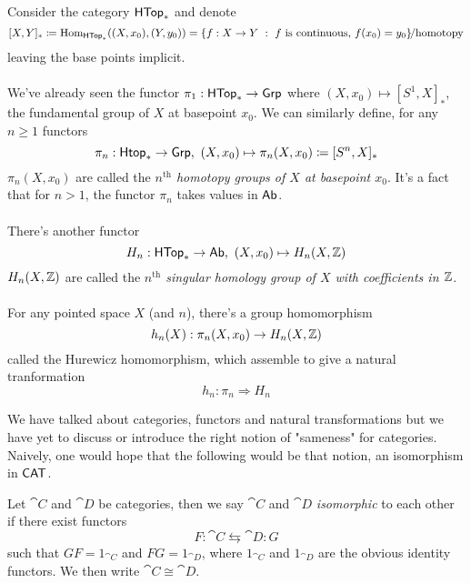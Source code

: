 \vspace*{0.2in}

\begin{example}
Consider the category $\mathsf{HTop}_*$ and denote
\[[X,Y]_* \coloneqq \mathrm{Hom}_{\mathsf{HTop}_*}((X,x_0),(Y,y_0)) = \left\{f:X \to Y\ :\ f \text{ is continuous, }f(x_0) = y_0\right\}\!\!/\text{homotopy}\]
leaving the base points implicit.\\
\\
We've already seen the functor $\pi_1:\mathsf{HTop}_* \to \mathsf{Grp}$ where $(X,x_0) \mapsto [S^1,X]_*$, the fundamental group of $X$ at basepoint $x_0$. We can similarly define, for any $n\geq 1$ functors
\[\pi_n:\mathsf{Htop}_* \to \mathsf{Grp},\ (X,x_0) \mapsto \pi_n(X,x_0) \coloneqq [S^n,X]_*\]
$\pi_n(X,x_0)$ are called the \emph{$n^{\text{th}}$ homotopy groups of $X$ at basepoint $x_0$}. It's a fact that for $n>1$, the functor $\pi_n$ takes values in $\mathsf{Ab}$.\\
\\
There's another functor \[H_n:\mathsf{HTop}_* \to \mathsf{Ab},\ (X,x_0) \mapsto H_n(X,\mathbb Z)\] $H_n(X,\mathbb Z)$ are called the \emph{$n^{\text{th}}$ singular homology group of $X$ with coefficients in $\mathbb Z$}.\\
\\
For any pointed space $X$ (and $n$), there's a group homomorphism
\[h_n(X):\pi_n(X,x_0) \to H_n(X,\mathbb Z)\]
called the Hurewicz homomorphism, which assemble to give a natural tranformation
\[h_n:\pi_n \Rightarrow H_n\]
\end{example}

\vspace{0.1in}

We have talked about categories, functors and natural transformations but we have yet to discuss or introduce the right notion of "sameness" for categories. Naively, one would hope that the following would be that notion, an isomorphism in $\mathsf{CAT}$.

\begin{definition}
Let $\cat{C}$ and $\cat{D}$ be categories, then we say $\cat{C}$ and $\cat{D}$ \emph{isomorphic} to each other if there exist functors \[F:\cat{C} \leftrightarrows \cat{D}:G\] such that $GF = 1_{\cat{C}}$ and $FG = 1_{\cat{D}}$, where $1_{\cat{C}}$ and $1_{\cat{D}}$ are the obvious identity functors. We then write $\cat{C} \cong \cat{D}$.
\end{definition}

\vspace*{0.1in}

